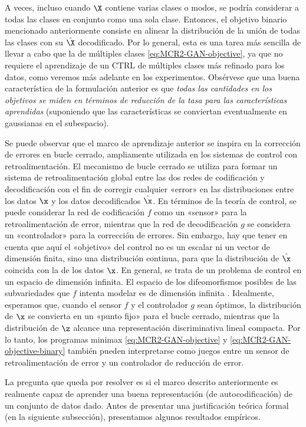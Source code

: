 \documentclass[../../book-main_es.tex]{subfiles}
\begin{document}
A veces, incluso cuando $\X$ contiene varias clases o modos, se podría
considerar a todas las clases en conjunto como una sola clase. Entonces, el objetivo binario
mencionado anteriormente consiste en alinear la distribución de la unión de todas las clases con
su $\hat \X$ decodificado. Por lo general, esta es una tarea más sencilla de llevar a cabo
que la de múltiples clases \eqref{eq:MCR2-GAN-objective}, ya que no
requiere el aprendizaje de un CTRL de múltiples clases más refinado para los datos,
como veremos más adelante en los experimentos. Obsérvese que una buena
característica de la formulación anterior es que {\em todas las cantidades
    en los objetivos se miden en términos de reducción de la tasa para las
características aprendidas} (suponiendo que las características se conviertan 
eventualmente en gaussianas en el subespacio).

Se puede observar que el marco de aprendizaje anterior se inspira
en la corrección de errores en bucle cerrado, ampliamente utilizada en los
sistemas de control con retroalimentación. El mecanismo de bucle cerrado se utiliza para formar un
sistema de retroalimentación global entre las dos redes de codificación y decodificación con el fin de
corregir cualquier «error» en las distribuciones entre los datos $\x$
y los datos decodificados $\hat \x$. En términos de la teoría de control, se
puede considerar la red de codificación $f$ como un «sensor» para la retroalimentación de error,
mientras que la red de decodificación $g$ se considera un «controlador» para la
corrección de errores. Sin embargo, hay que tener en cuenta que aquí el «objetivo» del control
no es un escalar ni un vector de dimensión finita, sino una distribución
continua, para que la distribución de $\hat \x$ coincida
con la de los datos $\x$. En general, se trata de un problema de control en un
espacio de dimensión infinita. El espacio de los difeomorfismos posibles de
las subvariedades que $f$ intenta modelar es de dimensión infinita
\cite{Lee2002IntroductionTS}. Idealmente, esperamos que, cuando el sensor $f$
y el controlador $g$ sean óptimos, la distribución de $\x$ se convierta
en un «punto fijo» para el bucle cerrado, mientras que la distribución de $\z$
alcance una representación discriminativa lineal compacta. Por lo tanto, los
programas minimax \eqref{eq:MCR2-GAN-objective} y
\eqref{eq:MCR2-GAN-objective-binary} también pueden interpretarse como juegos
entre un sensor de retroalimentación de error y un controlador de reducción de error.

La pregunta que queda por resolver es si el marco descrito anteriormente es realmente capaz
de aprender una buena representación (de autocodificación) de un conjunto de datos dado. Antes
de presentar una justificación teórica formal (en la siguiente
subsección), presentamos algunos resultados empíricos.
\end{document}
